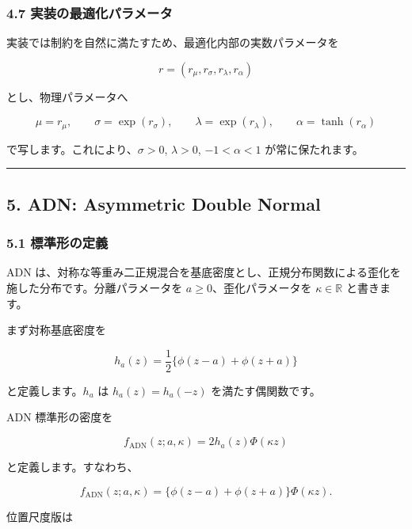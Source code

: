 \documentclass[
]{article}
\begin{document}
\hypertarget{ux5b9fux88c5ux306eux6700ux9069ux5316ux30d1ux30e9ux30e1ux30fcux30bf}{%
\subsubsection{4.7
実装の最適化パラメータ}\label{ux5b9fux88c5ux306eux6700ux9069ux5316ux30d1ux30e9ux30e1ux30fcux30bf}}

実装では制約を自然に満たすため、最適化内部の実数パラメータを

\[
r=(r_\mu,r_\sigma,r_\lambda,r_\alpha)
\]

とし、物理パラメータへ

\[
\mu=r_\mu,
\qquad
\sigma=\exp(r_\sigma),
\qquad
\lambda=\exp(r_\lambda),
\qquad
\alpha=\tanh(r_\alpha)
\]

で写します。これにより、\(\sigma>0\), \(\lambda>0\), \(-1<\alpha<1\)
が常に保たれます。

\begin{center}\rule{0.5\linewidth}{0.5pt}\end{center}

\hypertarget{adn-asymmetric-double-normal}{%
\subsection{5. ADN: Asymmetric Double
Normal}\label{adn-asymmetric-double-normal}}

\hypertarget{ux6a19ux6e96ux5f62ux306eux5b9aux7fa9-1}{%
\subsubsection{5.1
標準形の定義}\label{ux6a19ux6e96ux5f62ux306eux5b9aux7fa9-1}}

ADN
は、対称な等重み二正規混合を基底密度とし、正規分布関数による歪化を施した分布です。分離パラメータを
\(a\ge 0\)、歪化パラメータを \(\kappa\in\mathbb{R}\) と書きます。

まず対称基底密度を

\[
h_a(z)=\frac{1}{2}\{\phi(z-a)+\phi(z+a)\}
\]

と定義します。\(h_a\) は \(h_a(z)=h_a(-z)\) を満たす偶関数です。

ADN 標準形の密度を

\[
f_{\mathrm{ADN}}(z;a,\kappa)
=2h_a(z)\Phi(\kappa z)
\]

と定義します。すなわち、

\[
f_{\mathrm{ADN}}(z;a,\kappa)
=\{\phi(z-a)+\phi(z+a)\}\Phi(\kappa z).
\]

位置尺度版は
\end{document}
